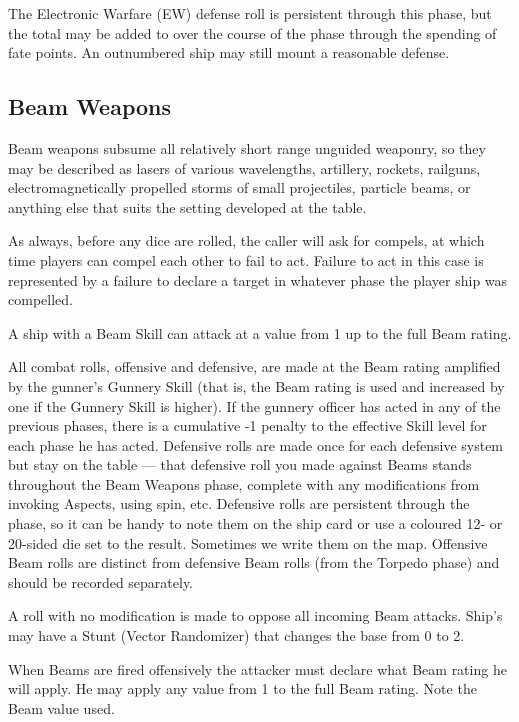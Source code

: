 The Electronic Warfare (EW) defense roll is persistent through this phase, but the total may be added to over the course of the phase through the spending of fate points. An outnumbered ship may still mount a reasonable defense.

\subsection{Beam Weapons}\label{sec:Beam Weapons} %

Beam weapons subsume all relatively short range unguided weaponry, so they may be described as lasers of various wavelengths, artillery, rockets, railguns, electromagnetically propelled storms of small projectiles, particle beams, or anything else that suits the setting developed at the table.

As always, before any dice are rolled, the caller will ask for compels, at which time players can compel each other to fail to act. Failure to act in this case is represented by a failure to declare a target in whatever phase the player ship was compelled.

A ship with a Beam Skill can attack at a value from 1 up to the full Beam rating.

All combat rolls, offensive and defensive, are made at the Beam rating amplified by the gunner's Gunnery Skill (that is, the Beam rating is used and increased by one if the Gunnery Skill is higher). If the gunnery officer has acted in any of the previous phases, there is a cumulative -1 penalty to the effective Skill level for each phase he has acted. Defensive rolls are made once for each defensive system but stay on the table --- that defensive roll you made against Beams stands throughout the Beam Weapons phase, complete with any modifications from invoking Aspects, using spin, etc. Defensive rolls are persistent through the phase, so it can be handy to note them on the ship card or use a coloured 12- or 20-sided die set to the result. Sometimes we write them on the map. Offensive Beam rolls are distinct from defensive Beam rolls (from the Torpedo phase) and should be recorded separately.

A roll with no modification is made to oppose all incoming Beam attacks. Ship's may have a Stunt (Vector Randomizer) that changes the base from 0 to 2.

When Beams are fired offensively the attacker must declare what Beam rating he will apply. He may apply any value from 1 to the full Beam rating. Note the Beam value used.

